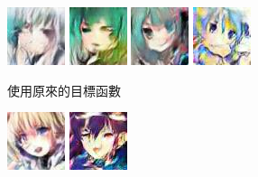 \documentclass[fleqn,a4paper,12pt]{article}
\begin{document}
\begin{figure}[H]
\centering
\begin{subfigure}{0.45\textwidth}
  \includegraphics[width=0.2\linewidth]{imgs/iwgan-230-original-loss/0-4-0.jpg}
  \includegraphics[width=0.2\linewidth]{imgs/iwgan-230-original-loss/10-0-0.jpg}
  \includegraphics[width=0.2\linewidth]{imgs/iwgan-230-original-loss/4-5-0.jpg}
  \includegraphics[width=0.2\linewidth]{imgs/iwgan-230-original-loss/5-3-0.jpg}
  \caption{使用原來的目標函數}
\end{subfigure}
\begin{subfigure}{0.45\textwidth}
  \includegraphics[width=0.2\linewidth]{imgs/iwgan-230-max-loss/0-4-0.jpg}
  \includegraphics[width=0.2\linewidth]{imgs/iwgan-230-max-loss/10-0-0.jpg}

\end{subfigure}
\end{figure}
\end{document}
